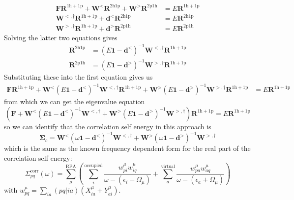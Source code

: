 \begin{tcolorbox}[colback=red!10!white, colframe=red!50!black, title=Downfolding exercise]
\begin{align}
    \bm{F} \bm{R}^{1\mathrm{h}+1\mathrm{p}} + \bm{W}^< \bm{R}^{2\mathrm{h}1\mathrm{p}} + \bm{W}^> \bm{R}^{2\mathrm{p}1\mathrm{h}} &= E \bm{R}^{1\mathrm{h}+1\mathrm{p}} \\
    \bm{W}^{<,\dagger} \bm{R}^{1\mathrm{h}+1\mathrm{p}} + \bm{d}^< \bm{R}^{2\mathrm{h}1\mathrm{p}} &= E \bm{R}^{2\mathrm{h}1\mathrm{p}} \\
    \bm{W}^{>, \dagger} \bm{R}^{1\mathrm{h}+1\mathrm{p}} + \bm{d}^> \bm{R}^{2\mathrm{p}1\mathrm{h}} &= E \bm{R}^{2\mathrm{p}1\mathrm{h}}
\end{align}
Solving the latter two equations gives
\begin{align}
    \bm{R}^{2\mathrm{h}1\mathrm{p}} &= \left(E \bm{1} - \bm{d}^<\right)^{-1} \bm{W}^{<,\dagger} \bm{R}^{1\mathrm{h}+1\mathrm{p}} \\
    \bm{R}^{2\mathrm{p}1\mathrm{h}} &= \left(E \bm{1} - \bm{d}^>\right)^{-1} \bm{W}^{>,\dagger} \bm{R}^{1\mathrm{h}+1\mathrm{p}}
\end{align}
Substituting these into the first equation gives us
\begin{align}
    \bm{F} \bm{R}^{1\mathrm{h}+1\mathrm{p}} + \bm{W}^< \left(E \bm{1} - \bm{d}^<\right)^{-1} \bm{W}^{<,\dagger} \bm{R}^{1\mathrm{h}+1\mathrm{p}} + \bm{W}^> \left(E \bm{1} - \bm{d}^>\right)^{-1} \bm{W}^{>,\dagger} \bm{R}^{1\mathrm{h}+1\mathrm{p}} &= E \bm{R}^{1\mathrm{h}+1\mathrm{p}}
\end{align}
from which we can get the eigenvalue equation
\begin{equation}
    \left(\bm{F} + \bm{W}^< \left(E \bm{1} - \bm{d}^<\right)^{-1} \bm{W}^{<,\dagger} + \bm{W}^> \left(E \bm{1} - \bm{d}^>\right)^{-1} \bm{W}^{>,\dagger}\right) \bm{R}^{1\mathrm{h}+1\mathrm{p}} = E \bm{R}^{1\mathrm{h}+1\mathrm{p}}
\end{equation}
so we can identify that the correlation self energy in this approach is
\begin{equation}
    \bm{\Sigma} _c = \bm{W}^< \left(\omega \bm{1} - \bm{d}^<\right)^{-1} \bm{W}^{<,\dagger} + \bm{W}^> \left(\omega \bm{1} - \bm{d}^>\right)^{-1} \bm{W}^{>,\dagger}
\end{equation}
which is the same as the known frequency dependent form for the real part of the correlation self energy:
\begin{equation}
    \Sigma _{pq}^{\text{corr}}(\omega) = \sum_{\mu }^{\text{RPA}}\left(\sum_{i}^{\text{occupied}} \frac{w_{pi}^{\mu }w_{iq}^{\mu }}{\omega -(\epsilon _{i}-\Omega  _{\mu })}+ \sum_{a}^{\text{virtual}} \frac{w_{pa}^{\mu }w_{aq}^{\mu }}{\omega -(\epsilon _{a}+\Omega  _{\mu })}\right)
\end{equation}
with $w_{pq}^{\mu } = \sum_{ia} (pq|ia) \left(X_{ia}^{\mu} + Y_{ai}^{\mu}\right)$.    
\end{tcolorbox}

